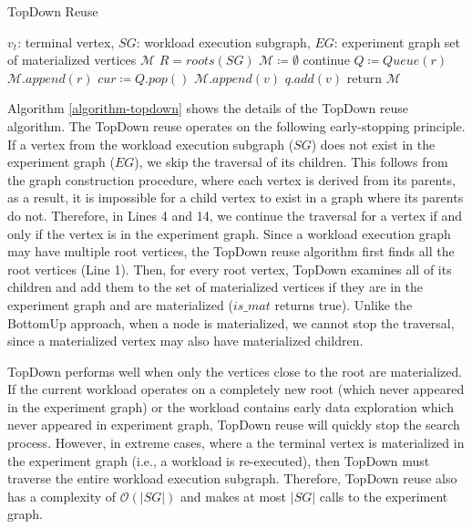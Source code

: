 {\begin{algorithm}[h]
\caption{TopDown Reuse}\label{algorithm-topdown}
\begin{algorithmic}[1]
\Require $v_t$: terminal vertex, $SG$: workload execution subgraph, $EG$: experiment graph 
\Ensure set of materialized vertices $\mathcal{M}$ 
\State $R=roots(SG)$
\State $\mathcal{M} \coloneqq \emptyset$
		\State continue 
	\EndIf
	\State $Q \coloneqq  Queue(r)$  
		 \State	 $\mathcal{M}.append(r)$
	\EndIf
			\State $cur \coloneqq  Q.pop()$
					\State	$\mathcal{M}.append(v)$
				\EndIf
					\State $q.add(v)$
				\EndIf
			\EndFor
		\EndWhile
\EndFor
\State return $\mathcal{M}$
\end{algorithmic}
\end{algorithm}
Algorithm \ref{algorithm-topdown} shows the details of the TopDown reuse algorithm.
The TopDown reuse operates on the following early-stopping principle.
If a vertex from the workload execution subgraph ($SG$) does not exist in the experiment graph ($EG$), we skip the traversal of its children.
This follows from the graph construction procedure, where each vertex is derived from its parents, as a result, it is impossible for a child vertex to exist in a graph where its parents do not.
Therefore, in Lines 4 and 14, we continue the traversal for a vertex if and only if the vertex is in the experiment graph.
Since a workload execution graph may have multiple root vertices, the TopDown reuse algorithm first finds all the root vertices (Line 1).
Then, for every root vertex, TopDown examines all of its children and add them to the set of materialized vertices if they are in the experiment graph and are materialized ($is\_mat$ returns true).
Unlike the BottomUp approach, when a node is materialized, we cannot stop the traversal, since a materialized vertex may also have materialized children.

TopDown performs well when only the vertices close to the root are materialized.
If the current workload operates on a completely new root (which never appeared in the experiment graph) or the workload contains early data exploration which never appeared in experiment graph, TopDown reuse will quickly stop the search process.
However, in extreme cases, where a the terminal vertex is materialized in the experiment graph (i.e., a workload is re-executed), then TopDown must traverse the entire workload execution subgraph.
Therefore, TopDown reuse also has a complexity of $\mathcal{O}(|SG|)$ and makes at most $|SG|$ calls to the experiment graph.

}
